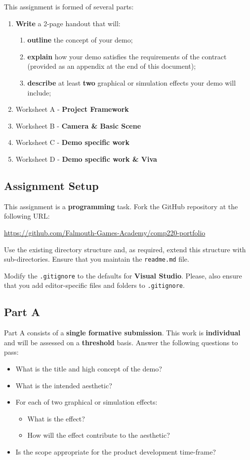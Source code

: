 \documentclass{../fal_assignment}
\begin{document}
This assignment is formed of several parts:
\begin{enumerate}[label=(\Alph*)]
	\item \textbf{Write} a 2-page handout that will:
		\begin{enumerate}[label=(\roman*)]
			\item \textbf{outline} the concept of your demo;
			\item \textbf{explain} how your demo satisfies the requirements of the contract (provided as an appendix at the end of this document);
			\item \textbf{describe} at least \textbf{two} graphical or simulation effects your demo will include;
		\end{enumerate}
	\item Worksheet A - \textbf{Project Framework}
	\item Worksheet B - \textbf{Camera \& Basic Scene}
	\item Worksheet C - \textbf{Demo specific work}
	\item Worksheet D - \textbf{Demo specific work \& Viva}
\end{enumerate}

\subsection*{Assignment Setup}

This assignment is a \textbf{programming} task. Fork the GitHub repository at the following URL:

\indent \url{https://github.com/Falmouth-Games-Academy/comp220-portfolio}

Use the existing directory structure and, as required, extend this structure with sub-directories.
Ensure that you maintain the \texttt{readme.md} file.

Modify the \texttt{.gitignore} to the defaults for \textbf{Visual Studio}.
Please, also ensure that you add editor-specific files and folders to \texttt{.gitignore}. 

\subsection*{Part A}

Part A consists of a \textbf{single formative submission}. This work is \textbf{individual} and will be assessed on a \textbf{threshold} basis. Answer the following questions to pass:

\begin{itemize}
	\item What is the title and high concept of the demo?
	\item What is the intended aesthetic?
	\item For each of two graphical or simulation effects:
	\begin{itemize}
		\item What is the effect?
		\item How will the effect contribute to the aesthetic?
	\end{itemize}
	\item Is the scope appropriate for the product development time-frame?
\end{itemize}
\end{document}
